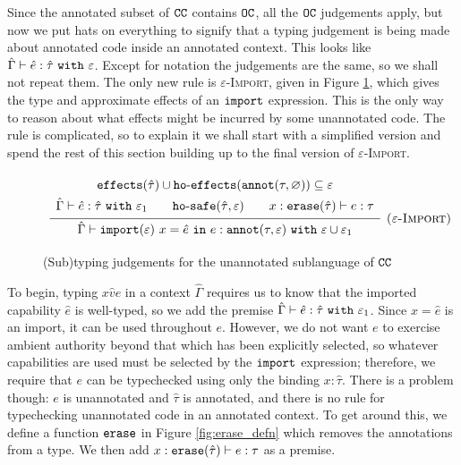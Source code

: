 Since the annotated subset of $\mathtt{CC}$ contains $\mathtt{OC}$, all the $\mathtt{OC}$ judgements apply, but now we put hats on everything to signify that a typing judgement is being made about annotated code inside an annotated context. This looks like $\hat \Gamma \vdash \hat e: \hat \tau~\mathtt{with}~ \varepsilon$. Except for notation the judgements are the same, so we shall not repeat them. The only new rule is \textsc{$\varepsilon$-Import}, given in Figure \ref{fig:import_rule}, which gives the type and approximate effects of an $\mathtt{import}$ expression. This is the only way to reason about what effects might be incurred by some unannotated code. The rule is complicated, so to explain it we shall start with a simplified version and spend the rest of this section building up to the final version of \textsc{$\varepsilon$-Import}.

\begin{figure}[h]
\vspace{-5pt}

\[
\begin{array}{c}

\infer[\textsc{($\varepsilon$-Import)}]
	{ \hat \Gamma \vdash \kwa{import}(\varepsilon)~x = \hat e~\kw{in} e: \kwa{annot}(\tau, \varepsilon)~\kw{with} \varepsilon \cup \varepsilon_1 }
{{\def\arraystretch{1.4}
  \begin{array}{c}
\kwa{effects}(\hat \tau) \cup \hofx{\annot{\tau}{\varnothing}}\subseteq \varepsilon \\
\hat \Gamma \vdash \hat e: \hat \tau~\kw{with} \varepsilon_1 ~~~~~~ \kwa{ho \hyphen safe}(\hat \tau, \varepsilon) ~~~~~~ x: \kwa{erase}(\hat \tau) \vdash e: \tau
  \end{array}}} 
 
\end{array}
\]
\vspace{-7pt}
\caption{(Sub)typing judgements for the unannotated sublanguage of $\mathtt{CC}$}
\label{fig:import_rule}
\end{figure}

To begin, typing ${x}{\hat v}{e}$ in a context $\hat \Gamma$ requires us to know that the imported capability $\hat e$ is well-typed, so we add the premise $\hat \Gamma \vdash \hat e: \hat \tau~\mathtt{with}~ \varepsilon_1$. Since $x = \hat e$ is an import, it can be used throughout $e$. However, we do not want $e$ to exercise ambient authority beyond that which has been explicitly selected, so whatever capabilities are used must be selected by the $\mathtt{import}$ expression; therefore, we require that $e$ can be typechecked using only the binding $x: \hat \tau$. There is a problem though: $e$ is unannotated and $\hat \tau$ is annotated, and there is no rule for typechecking unannotated code in an annotated context. To get around this, we define a function $\mathtt{erase}$ in Figure \ref{fig:erase_defn} which removes the annotations from a type. We then add $x: \mathtt{erase}(\hat \tau) \vdash e: \tau$ as a premise.

